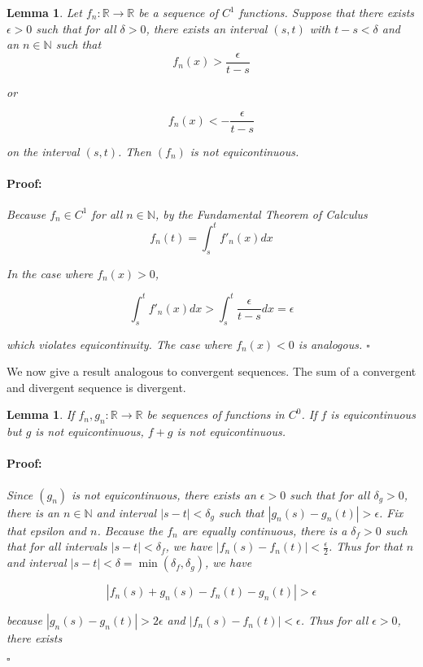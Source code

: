 \documentclass{article}
\newenvironment{proof}{\paragraph{Proof:}}{\hfill$\square$}
\newtheorem{lemma}[theorem]{Lemma}
\newcommand{\R}{\mathbb{R}}
\newcommand{\N}{\mathbb{N}}
\begin{document}
\begin{lemma}
Let $f_n: \R \rightarrow \R$ be a sequence of $C^1$ functions. Suppose that there exists $\epsilon > 0$ such that for all $\delta > 0$, there exists an interval $(s, t)$ with $t-s < \delta$ and an $n \in \N$ such that
\[
f_n(x) > \frac{\epsilon}{t-s}
\]

or

\[
f_n(x) < -\frac{\epsilon}{t-s}
\]

on the interval $(s, t)$. Then $(f_n)$ is not equicontinuous.
\begin{proof}
Because $f_n \in C^1$ for all $n \in \N$, by the Fundamental Theorem of Calculus
\[
f_n(t) = \int_s^t f'_n(x)dx
\]

In the case where $f_n(x) > 0$,

\[
\int_s^t f'_n(x)dx > \int_s^t \frac{\epsilon}{t-s} dx = \epsilon
\]

which violates equicontinuity. The case where $f_n(x) < 0$ is analogous.
\end{proof}
\end{lemma}

We now give a result analogous to convergent sequences. The sum of a convergent and divergent sequence is divergent.

\begin{lemma}
If $f_n, g_n: \R \rightarrow \R$ be sequences of functions in $C^0$. If $f$ is equicontinuous but $g$ is not equicontinuous, $f+g$ is not equicontinuous.
\begin{proof}
Since $(g_n)$ is not equicontinuous, there exists an $\epsilon > 0$ such that for all $\delta_g>0$, there is an $n \in \N$ and interval $|s-t| < \delta_g$ such that $|g_n(s) - g_n(t)| > \epsilon$. Fix that epsilon and $n$. Because the $f_n$ are equally continuous, there is a $\delta_f > 0$ such that for all intervals $|s-t| < \delta_f$, we have $|f_n(s) - f_n(t)| < \frac{\epsilon}{2}$. Thus for that $n$ and interval $|s-t| < \delta = \min(\delta_f, \delta_g)$, we have

\[
|f_n(s) + g_n(s)- f_n(t) - g_n(t)| > \epsilon
\]

because $|g_n(s) - g_n(t)| > 2 \epsilon$ and $|f_n(s) - f_n(t)| < \epsilon$. Thus for all $\epsilon > 0$, there exists 

\end{proof}
\end{lemma}
\end{document}
